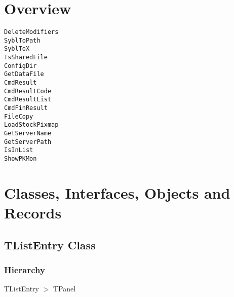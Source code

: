 \documentclass{report}
\newif\ifpdf
\begin{document}
\section{Overview}
\begin{description}
\item[\texttt{\begin{ttfamily}TListEntry\end{ttfamily} Class}]
\end{description}
\begin{description}
\item[\texttt{DeleteModifiers}]
\item[\texttt{SyblToPath}]
\item[\texttt{SyblToX}]
\item[\texttt{IsSharedFile}]
\item[\texttt{ConfigDir}]
\item[\texttt{GetDataFile}]
\item[\texttt{CmdResult}]
\item[\texttt{CmdResultCode}]
\item[\texttt{CmdResultList}]
\item[\texttt{CmdFinResult}]
\item[\texttt{FileCopy}]
\item[\texttt{LoadStockPixmap}]
\item[\texttt{GetServerName}]
\item[\texttt{GetServerPath}]
\item[\texttt{IsInList}]
\item[\texttt{ShowPKMon}]
\end{description}
\section{Classes, Interfaces, Objects and Records}
\ifpdf
\subsection*{\large{\textbf{TListEntry Class}}\normalsize\hspace{1ex}\hrulefill}
\else
\subsection*{TListEntry Class}
\fi
\label{common.TListEntry}
\subsubsection*{\large{\textbf{Hierarchy}}\normalsize\hspace{1ex}\hfill}
TListEntry {$>$} TPanel
\end{document}
